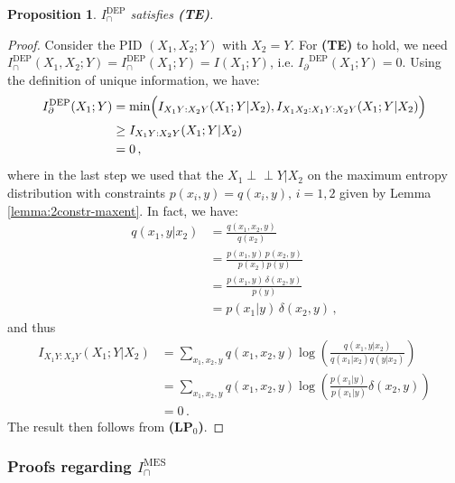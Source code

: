 \documentclass{article}
\newcommand{\ts}[1]{\ensuremath{_{\text{#1}}}}
\newcommand{\ind}{\mathrel{\perp\!\!\!\perp}}
\newcommand{\Ip}{\ensuremath{I_\partial}\xspace}
\newcommand{\LPz}{\textbf{(LP\ts{0})}\xspace} %
\newcommand{\TE}{\textbf{(TE)}\xspace} %
\newcommand{\IDEP}{\ensuremath{I_\cap^{\text{DEP}}}\xspace}
\newcommand{\IMES}{\ensuremath{I_\cap^{\text{MES}}}\xspace}
\newtheorem{proposition}{Proposition}
\begin{document}
\begin{proposition} \label{prop:DEP-TE}
    $\IDEP$ satisfies \TE.
\end{proposition}
\begin{proof}
    Consider the PID $(X_1,X_2;Y)$ with $X_2=Y$. For \TE to hold, we need $\IDEP(X_1,X_2;Y)=\IDEP(X_1;Y)=I(X_1;Y)$, i.e. $\Ip^\text{DEP}(X_1;Y)=0$. Using the definition of unique information, we have:
    \begin{equation}
    \begin{aligned}
        I_\partial^\text{DEP}(X_1;Y) & = \min\Bigl(I_{X_1Y:X_2Y}(X_1;Y|X_2), I_{X_1X_2:X_1Y:X_2Y}(X_1;Y|X_2) \Bigr) \\
        & \geq I_{X_1Y:X_2Y}(X_1;Y|X_2) \\
        & = 0 \,,
    \end{aligned}
    \end{equation}
    where in the last step we used that the $X_1\ind Y|X_2$ on the maximum entropy distribution with constraints $p(x_i,y)=q(x_i,y),\,i=1,2$ given by Lemma \ref{lemma:2constr-maxent}.
    In fact, we have:
    \begin{equation}
    \begin{aligned}
        q(x_1,y|x_2) & = \frac{q(x_1,x_2,y)}{q(x_2)} \\
        & =  \frac{p(x_1,y)\,p(x_2,y)}{p(x_2)p(y)} \\
        & =  \frac{p(x_1,y)\,\delta(x_2,y)}{p(y)} \\
        & =  p(x_1|y)\,\delta(x_2,y) \,,
    \end{aligned}
    \end{equation}
    and thus 
    \begin{equation}
    \begin{aligned}
        I_{X_1Y:X_2Y}(X_1;Y|X_2) & = \sum_{x_1,x_2,y} q(x_1,x_2,y) \log \left(\frac{q(x_1,y|x_2)}{q(x_1|x_2)q(y|x_2)} \right) \\
        & = \sum_{x_1,x_2,y} q(x_1,x_2,y) \log \left(\frac{p(x_1|y)\,}{p(x_1|y)}\delta(x_2,y)\right) \\
        & = 0 \,.
    \end{aligned}
    \end{equation}
    The result then follows from \LPz.
\end{proof}

\subsubsection{Proofs regarding \IMES}
\end{document}
